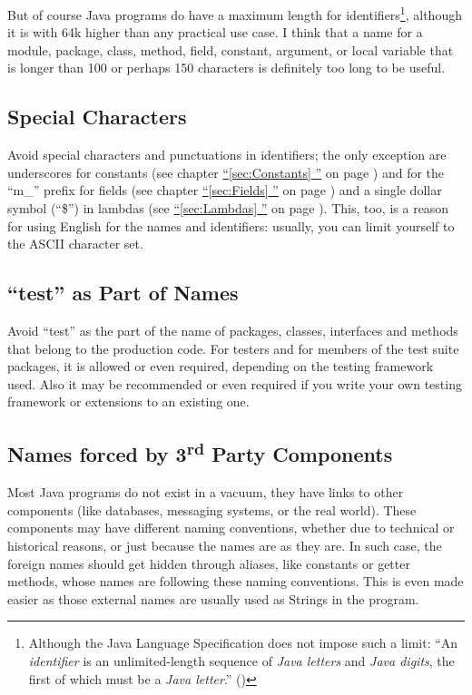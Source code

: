 \documentclass[12pt,a4paper,titlepage, parskip=half, headsepline, footsepline, cleardoubleplain]{scrbook}
\newcommand*{\tqfullvref}[1]{\hyperref[{#1}]{“\ref*{#1} \nameref*{#1}”} on page \pageref{#1}}
\begin{document}
But of course Java programs do have a maximum length for identifiers\footnote{Although the Java Language Specification does not impose such a limit: “An \textit{identifier} is an unlimited-length sequence of \textit{Java letters} and \textit{Java digits}, the first of which must be a \textit{Java letter}.” (\autocite{ORACLE_DOC_LANGUAGE_SPECIFICATION:Identifiers})}, although it is with 64k higher than any practical use case. I think that a name for a module, package, class, method, field, constant, argument, or local variable that is longer than 100 or perhaps 150 characters is definitely too long to be useful.

\subsection{Special Characters}
Avoid special characters and punctuations in identifiers; the only exception are underscores for constants (see chapter \tqfullvref{sec:Constants}) and for the “m\_” prefix for fields (see chapter \tqfullvref{sec:Fields}) and a single dollar symbol (“\$”) in lambdas (see \tqfullvref{sec:Lambdas}). This, too, is a reason for using English for the names and identifiers: usually, you can limit yourself to the ASCII character set.

\subsection{“test” as Part of Names}
Avoid “test” as the part of the name of packages, classes, interfaces and methods that belong to the production code. For testers and for members of the test suite packages, it is allowed or even required, depending on the testing framework used. Also it may be recommended or even required if you write your own testing framework or extensions to an existing one.

\subsection{Names forced by 3\textsuperscript{rd} Party Components}
Most Java programs do not exist in a vacuum, they have links to other components (like databases, messaging systems, or the real world). These components may have different naming conventions, whether due to technical or historical reasons, or just because the names are as they are. In such case, the foreign names should get hidden through aliases, like constants or getter methods, whose names are following these naming conventions. This is even made easier as those external names are usually used as Strings in the program.
\end{document}
